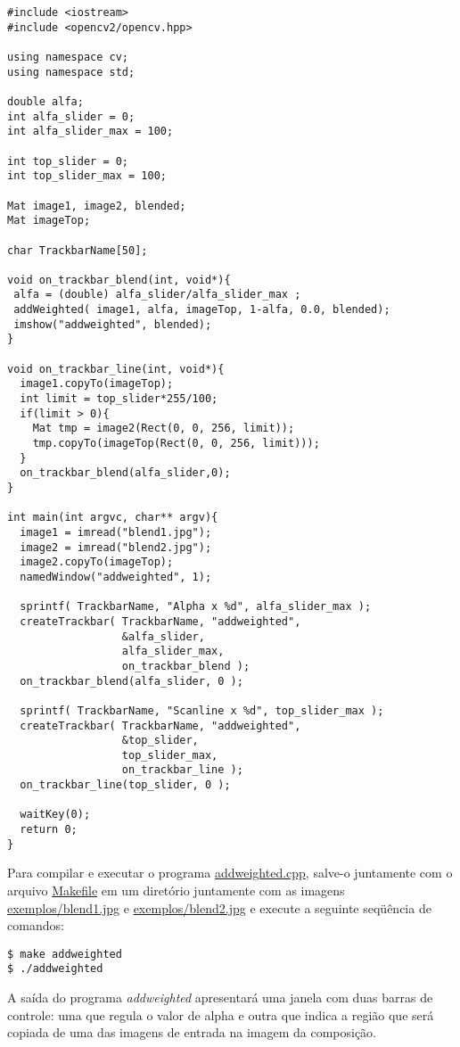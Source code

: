 \documentclass[11pt]{amsbook}
\begin{document}
\begin{verbatim}
#include <iostream>
#include <opencv2/opencv.hpp>

using namespace cv;
using namespace std;

double alfa;
int alfa_slider = 0;
int alfa_slider_max = 100;

int top_slider = 0;
int top_slider_max = 100;

Mat image1, image2, blended;
Mat imageTop;

char TrackbarName[50];

void on_trackbar_blend(int, void*){
 alfa = (double) alfa_slider/alfa_slider_max ;
 addWeighted( image1, alfa, imageTop, 1-alfa, 0.0, blended);
 imshow("addweighted", blended);
}

void on_trackbar_line(int, void*){
  image1.copyTo(imageTop);
  int limit = top_slider*255/100;
  if(limit > 0){
	Mat tmp = image2(Rect(0, 0, 256, limit));
	tmp.copyTo(imageTop(Rect(0, 0, 256, limit)));
  }
  on_trackbar_blend(alfa_slider,0);
}

int main(int argvc, char** argv){
  image1 = imread("blend1.jpg");
  image2 = imread("blend2.jpg");
  image2.copyTo(imageTop);
  namedWindow("addweighted", 1);

  sprintf( TrackbarName, "Alpha x %d", alfa_slider_max );
  createTrackbar( TrackbarName, "addweighted",
				  &alfa_slider,
				  alfa_slider_max,
				  on_trackbar_blend );
  on_trackbar_blend(alfa_slider, 0 );

  sprintf( TrackbarName, "Scanline x %d", top_slider_max );
  createTrackbar( TrackbarName, "addweighted",
				  &top_slider,
				  top_slider_max,
				  on_trackbar_line );
  on_trackbar_line(top_slider, 0 );

  waitKey(0);
  return 0;
}
\end{verbatim}

Para compilar e executar o programa
\href{exemplos/addweighted.cpp}{addweighted.cpp}, salve-o juntamente com
o arquivo \href{exemplos/Makefile}{Makefile} em um diretório juntamente
com as imagens \href{exemplos/blend1.jpg}{exemplos/blend1.jpg} e \href{exemplos/blend2.jpg}{exemplos/blend2.jpg}
e execute a seguinte seqüência de comandos:


\begin{verbatim}
$ make addweighted
$ ./addweighted
\end{verbatim}

A saída do programa \emph{addweighted} apresentará uma janela com duas
barras de controle: uma que regula o valor de alpha e outra que
indica a região que será copiada de uma das imagens de entrada na
imagem da composição.
\end{document}
